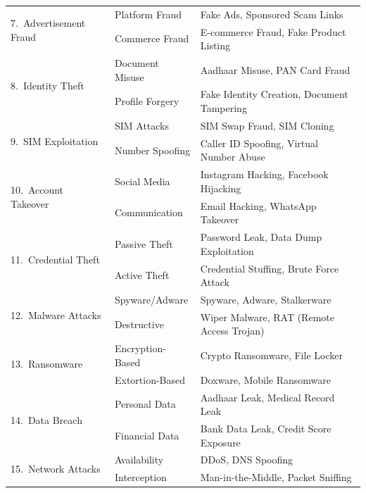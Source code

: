 \documentclass[10pt,a4paper]{article}
\begin{document}
\begin{longtable}{|l|l|p{7cm}|}
\multirow{2}{*}{7.\ Advertisement Fraud}
  & Platform Fraud      & Fake Ads, Sponsored Scam Links \\
  & Commerce Fraud      & E-commerce Fraud, Fake Product Listing \\
\hline

\multirow{2}{*}{8.\ Identity Theft}
  & Document Misuse     & Aadhaar Misuse, PAN Card Fraud \\
  & Profile Forgery     & Fake Identity Creation, Document Tampering \\
\hline

\multirow{2}{*}{9.\ SIM Exploitation}
  & SIM Attacks         & SIM Swap Fraud, SIM Cloning \\
  & Number Spoofing     & Caller ID Spoofing, Virtual Number Abuse \\
\hline

\multirow{2}{*}{10.\ Account Takeover}
  & Social Media        & Instagram Hacking, Facebook Hijacking \\
  & Communication       & Email Hacking, WhatsApp Takeover \\
\hline

\multirow{2}{*}{11.\ Credential Theft}
  & Passive Theft       & Password Leak, Data Dump Exploitation \\
  & Active Theft        & Credential Stuffing, Brute Force Attack \\
\hline

\multirow{2}{*}{12.\ Malware Attacks}
  & Spyware/Adware      & Spyware, Adware, Stalkerware \\
  & Destructive         & Wiper Malware, RAT (Remote Access Trojan) \\
\hline

\multirow{2}{*}{13.\ Ransomware}
  & Encryption-Based    & Crypto Ransomware, File Locker \\
  & Extortion-Based     & Doxware, Mobile Ransomware \\
\hline

\multirow{2}{*}{14.\ Data Breach}
  & Personal Data       & Aadhaar Leak, Medical Record Leak \\
  & Financial Data      & Bank Data Leak, Credit Score Exposure \\
\hline

\multirow{2}{*}{15.\ Network Attacks}
  & Availability        & DDoS, DNS Spoofing \\
  & Interception        & Man-in-the-Middle, Packet Sniffing \\
\hline


\end{longtable}
\end{document}
